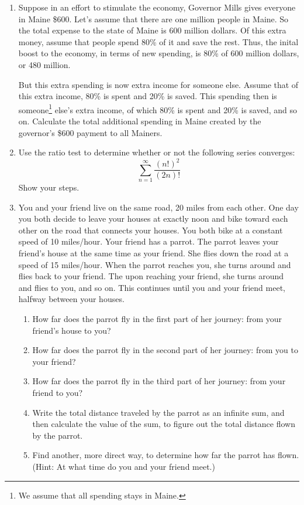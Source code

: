 \documentclass[12pt]{article}
\begin{document}
\begin{enumerate}

  \item Suppose in an effort to stimulate the economy, Governor Mills
    gives everyone in Maine \$600.  Let's assume that there are one
    million people in Maine. So the total expense to the state of
    Maine is 600 million dollars. Of this extra money, assume that
    people spend 80\% of it and save the rest. Thus, the inital boost
    to the economy, in terms of new spending, is 80\% of 600 million
    dollars, or 480 million.

    But this extra spending is now extra income for someone
    else. Assume that of this extra income, 80\% is spent and 20\% is
    saved. This spending then is someone\footnote{We assume
     that all spending stays in Maine.} else's extra income, of which
    80\% is spent and 20\% is saved, and so on. Calculate the total
    additional spending in Maine created by the governor's \$600
    payment to all Mainers. 

\item Use the ratio test to determine whether or not the following
  series converges:
  \begin{equation}
    \sum_{n=1}^\infty \frac{(n!)^2}{(2n)!}
    \end{equation}
  Show your steps.
  
\item You and your friend live on the same road, 20 miles from each
  other. One day you both decide to leave your houses at exactly noon
  and bike toward each other on the road that connects your
  houses. You both bike at a constant speed of 10 miles/hour. Your
  friend has a parrot. The parrot leaves your friend's house at the
  same time as your friend. She flies down the road at a speed of 15
  miles/hour. When the parrot reaches you, she turns around and flies
  back to your friend. The upon reaching your friend, she turns around
  and flies to you, and so on. This continues until you and your
  friend meet, halfway between your houses. 
  \begin{enumerate}
      \item How far does the parrot fly in the first part of her
        journey: from your friend's house to you?
      \item How far does the parrot fly in the second part of her
        journey: from you to your friend?
      \item How far does the parrot fly in the third part of her
        journey: from your friend to you?
      \item Write the total distance traveled by the parrot as an
        infinite sum, and then calculate the value of the sum, to
        figure out the total distance flown by the parrot.
      \item Find another, more direct way, to determine how far the
        parrot has flown. (Hint: At what time do you and your friend
        meet.)
    \end{enumerate}
  
\end{enumerate}
    
\end{document}
